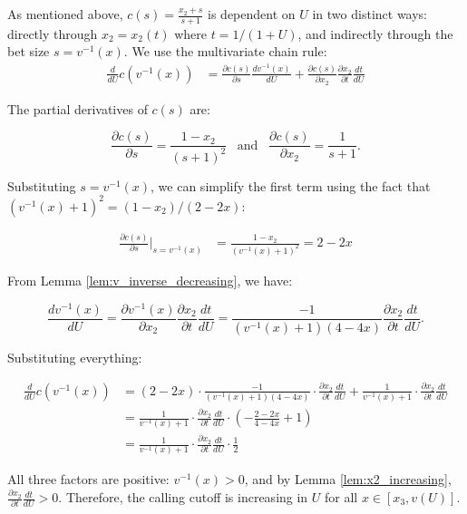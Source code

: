 \documentclass[../../main/main.tex]{subfiles}
\begin{document}
\begin{customproof}
    As mentioned above, $c(s) = \frac{x_2 + s}{s+1}$ is dependent on $U$ in two distinct ways: directly through $x_2 = x_2(t)$ where $t = 1/(1+U)$, and indirectly through the bet size $s = v^{-1}(x)$. We use the multivariate chain rule:
    \begin{align*}
        \frac{d}{dU} c(v^{-1}(x)) & = \frac{\partial c(s)}{\partial s} \frac{d v^{-1}(x)}{d U} + \frac{\partial c(s)}{\partial x_2} \frac{\partial x_2}{\partial t} \frac{dt}{dU}
    \end{align*}

    The partial derivatives of $c(s)$ are:

    $$ \frac{\partial c(s)}{\partial s} = \frac{1-x_2}{(s+1)^2} \; \; \; \text{and} \; \; \; \frac{\partial c(s)}{\partial x_2} = \frac{1}{s+1}. $$

    Substituting $s = v^{-1}(x)$, we can simplify the first term using the fact that $(v^{-1}(x)+1)^2 = (1-x_2)/(2-2x)$:

    \begin{align*}
        \frac{\partial c(s)}{\partial s} \bigg|_{s=v^{-1}(x)} & = \frac{1-x_2}{(v^{-1}(x)+1)^2} = 2-2x
    \end{align*}

    From Lemma \ref{lem:v_inverse_decreasing}, we have:

    $$ \frac{d v^{-1}(x)}{d U} = \frac{\partial v^{-1}(x)}{\partial x_2} \frac{\partial x_2}{\partial t} \frac{dt}{dU} = \frac{-1}{(v^{-1}(x)+1)(4-4x)} \frac{\partial x_2}{\partial t} \frac{dt}{dU}. $$

    Substituting everything:

    \begin{align*}
        \frac{d}{dU} c(v^{-1}(x)) & =
        (2-2x) \cdot \frac{-1}{(v^{-1}(x)+1)(4-4x)} \cdot \frac{\partial x_2}{\partial t} \frac{dt}{dU}
        + \frac{1}{v^{-1}(x)+1} \cdot \frac{\partial x_2}{\partial t} \frac{dt}{dU}\\
        & = \frac{1}{v^{-1}(x)+1} \cdot \frac{\partial x_2}{\partial t} \frac{dt}{dU} \cdot \left( -\frac{2-2x}{4-4x} + 1\right) \\
        & = \frac{1}{v^{-1}(x)+1} \cdot \frac{\partial x_2}{\partial t} \frac{dt}{dU} \cdot \frac{1}{2}
    \end{align*}

    All three factors are positive: $v^{-1}(x) > 0$, and by Lemma \ref{lem:x2_increasing}, $\frac{\partial x_2}{\partial t} \frac{dt}{dU} > 0$. Therefore, the calling cutoff is increasing in $U$ for all $x \in [x_3, v(U)]$.

\end{customproof}
\end{document}
